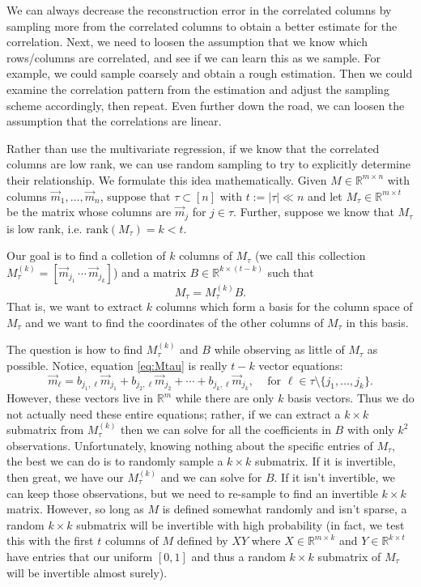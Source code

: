 \documentclass[12pt]{article}
\begin{document}
We can always decrease the reconstruction error in the correlated columns by sampling more from the correlated columns to obtain a better estimate for the correlation. Next, we need to loosen the assumption that we know which rows/columns are correlated, and see if we can learn this as we sample. For example, we could sample coarsely and obtain a rough estimation. Then we could examine the correlation pattern from the estimation and adjust the sampling scheme accordingly, then repeat. Even further down the road, we can loosen the assumption that the correlations are linear.

\noindent\makebox[\linewidth]{\rule{\textwidth}{2pt}} 

Rather than use the multivariate regression, if we know that the correlated columns are low rank, we can use random sampling to try to explicitly determine their relationship. We formulate this idea mathematically. Given $M \in \mathbb R^{m\times n}$ with columns $\vec m_1, \ldots, \vec m_n$, suppose that $\tau \subset [n]$ with $t := \lvert \tau \rvert \ll n$ and let $M_\tau \in \mathbb R^{m\times t}$ be the matrix whose columns are $\vec m_{j}$ for $j \in \tau$. Further, suppose we know that $M_\tau$ is low rank, i.e. $\text{rank}(M_\tau) = k < t$. 

Our goal is to find a colletion of $k$ columns of $M_\tau$ (we call this collection $M^{(k)}_\tau = [\vec m_{j_1} \, \cdots \, \vec m_{j_k}]$) and a matrix $B \in \mathbb R^{k \times (t-k)}$ such that \begin{equation} \label{eq:Mtau} \tag{\hexstar}M_\tau = M_{\tau}^{(k)}B.\end{equation} That is, we want to extract $k$ columns which form a basis for the column space of $M_\tau$ and we want to find the coordinates of the other columns of $M_\tau$ in this basis.

The question is how to find $M^{(k)}_{\tau}$ and $B$ while observing as little of $M_\tau$ as possible. Notice, equation \eqref{eq:Mtau} is really $t-k$ vector equations: $$\vec m_\ell = b_{j_1,\ell} \vec m_{j_1} + b_{j_2,\ell} \vec m_{j_2} + \cdots + b_{j_k,\ell} \vec m_{j_k}, \,\,\,\,\, \text{ for } \ell \in \tau \setminus \{j_1, \ldots, j_k \}.$$ However, these vectors live in $\mathbb R^m$ while there are only $k$ basis vectors. Thus we do not actually need these entire equations; rather, if we can extract a $k\times k$ submatrix from $M^{(k)}_\tau$ then we can solve for all the coefficients in $B$ with only $k^2$ observations. Unfortunately, knowing nothing about the specific entries of $M_\tau$, the best we can do is to randomly sample a $k \times k$ submatrix. If it is invertible, then great, we have our $M^{(k)}_\tau$ and we can solve for $B$. If it isn't invertible, we can keep those observations, but we need to re-sample to find an invertible $k\times k$ matrix. However, so long as $M$ is defined somewhat randomly and isn't sparse, a random $k\times k$ submatrix will be invertible with high probability (in fact, we test this with the first $t$ columns of $M$ defined by $XY$ where $ X \in \mathbb R^{m\times k}$ and $Y \in \mathbb R^{k\times t}$ have entries that our uniform $[0,1]$ and thus a random $k\times k$ submatrix of $M_\tau$ will be invertible almost surely). 
\end{document}
